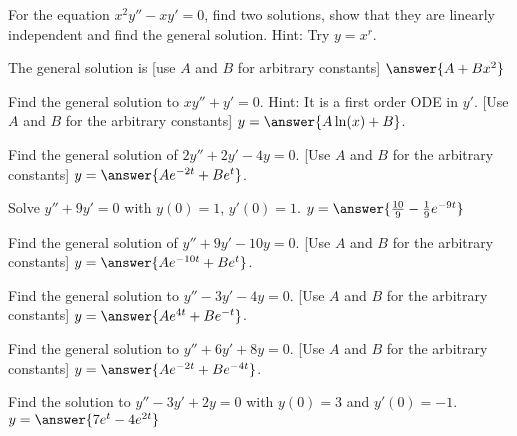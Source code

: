 \documentclass{ximera}
\begin{document}
\begin{exercise}
    For the equation $x^2 y'' - x y' = 0$, find two solutions, show that they are linearly independent and find the general solution.
    Hint: Try $y = x^r$.
    
    The general solution is [use $A$ and $B$ for arbitrary constants] $\answer{A + Bx^2}$
\end{exercise}

\begin{exercise}%
    Find the general solution to $x y'' + y' = 0$.  Hint: It is a first order ODE in $y'$. [Use $A$ and $B$ for the arbitrary constants] $y = \answer{A\ln(x) + B}$.
\end{exercise}

\begin{exercise}
    Find the general solution of $2y'' + 2y' -4 y = 0$. [Use $A$ and $B$ for the arbitrary constants] $y = \answer{Ae^{-2t} + Be^{t}}$.
\end{exercise}

\begin{exercise}
    Solve $y'' + 9y' = 0$ with $y(0) = 1$, $y'(0) = 1$. $y = \answer{\frac{10}{9} - \frac{1}{9}e^{-9t}}$
\end{exercise}
\begin{exercise}
    Find the general solution of $y'' + 9y' - 10 y = 0$. [Use $A$ and $B$ for the arbitrary constants] $y = \answer{Ae^{-10t} + Be^t}$.
\end{exercise}

\begin{exercise}
    Find the general solution to $y'' - 3y' - 4y = 0$. [Use $A$ and $B$ for the arbitrary constants] $y = \answer{Ae^{4t} + Be^{-t}}$.
\end{exercise}

\begin{exercise}
    Find the general solution to $y'' + 6y' + 8y = 0$. [Use $A$ and $B$ for the arbitrary constants] $y = \answer{Ae^{-2t} + Be^{-4t}}$.
\end{exercise}

\begin{exercise}
    Find the solution to $y'' - 3y' + 2y = 0$ with $y(0) = 3$ and $y'(0) = -1$. $y = \answer{7e^t - 4e^{2t}}$
\end{exercise}
\end{document}
